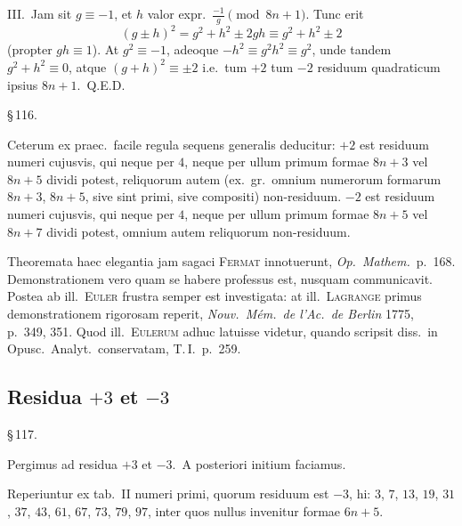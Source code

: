 \documentclass[12pt,a4paper]{article}
\theoremstyle{plain}
\theoremstyle{definition}
\theoremstyle{remark}
\begin{document}
III.\ Jam sit $g \equiv -1$, et $h$ valor expr.\ $\frac{-1}{g} \pmod{8n+1}$. Tunc erit
\[
(g \pm h)^2 = g^2 + h^2 \pm 2gh \equiv g^2 + h^2 \pm 2
\]
(propter $gh \equiv 1$). At $g^2 \equiv -1$, adeoque $-h^2 \equiv g^2h^2 \equiv g^2$, unde tandem $g^2 + h^2 \equiv 0$, atque $(g + h)^2 \equiv \pm 2$ i.e.\ tum $+2$ tum $-2$ residuum quadraticum ipsius $8n+1$.\ Q.E.D.

\begin{center}\S\,116.\end{center}

Ceterum ex praec.\ facile regula sequens generalis deducitur: $+2$ est residuum numeri cujusvis, qui neque per $4$, neque per ullum primum formae $8n+3$ vel $8n+5$ dividi potest, reliquorum autem (ex.\ gr.\ omnium numerorum formarum $8n+3$, $8n+5$, sive sint primi, sive compositi) non-residuum. $-2$ est residuum numeri cujusvis, qui neque per $4$, neque per ullum primum formae $8n+5$ vel $8n+7$ dividi potest, omnium autem reliquorum non-residuum.

Theoremata haec elegantia jam sagaci \textsc{Fermat} innotuerunt, \emph{Op.\ Mathem.}\ p.~168. Demonstrationem vero quam se habere professus est, nusquam communicavit. Postea ab ill.\ \textsc{Euler} frustra semper est investigata: at ill.\ \textsc{Lagrange} primus demonstrationem rigorosam reperit, \emph{Nouv.\ M\'em.\ de l'Ac.\ de Berlin} 1775, p.~349, 351. Quod ill.\ \textsc{Eulerum} adhuc latuisse videtur, quando scripsit diss.\ in Opusc.\ Analyt.\ conservatam, T.\,I.\ p.~259.

\subsection*{Residua $+3$ et $-3$}

\begin{center}\S\,117.\end{center}

Pergimus ad residua $+3$ et $-3$.\ A posteriori initium faciamus.

Reperiuntur ex tab.\ II numeri primi, quorum residuum est $-3$, hi: $3$, $7$, $13$, $19$, $31$, $37$, $43$, $61$, $67$, $73$, $79$, $97$, inter quos nullus invenitur formae $6n+5$.
\end{document}
